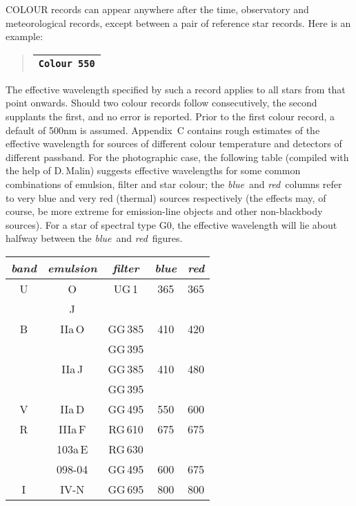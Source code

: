 COLOUR records can appear anywhere after the time,
observatory and meteorological records, except between a
pair of reference star records.  Here is an example:
\begin{quote}
\begin{tabular}{|l|}
\hline
\verb|Colour 550| \\
\hline
\end{tabular}
\end{quote}
The effective
wavelength specified by such a record applies to all
stars from that point onwards.
Should two colour records
follow consecutively, the second supplants the first, and
no error is reported.
Prior to the first colour record,
a default of 500nm is assumed.
Appendix~C contains rough
estimates
of the effective wavelength for sources of different
colour temperature and detectors of different passband.
For the photographic case, the following
table (compiled with the help of D.\,Malin) suggests effective
wavelengths for some common combinations of emulsion, filter and
star colour;  the {\it blue}\, and {\it red}\, columns refer
to very blue and very
red (thermal) sources respectively (the effects may, of
course, be more extreme for emission-line objects and other
non-blackbody sources).  For a star of spectral type G0, the
effective wavelength will lie about halfway between the
{\it blue}\, and {\it red}\, figures.

\begin{center}
\begin{tabular}{|c|c|c||c|c|}
\hline
{\it band} & {\it emulsion} & {\it filter} & {\it blue} & {\it red} \\
\hline \hline
U & O & UG\,1 & 365 & 365 \\
  & J &       &     &     \\
\hline
B & IIa\,O & GG\,385 & 410 & 420 \\
  &        & GG\,395 &     &     \\
\cline{2-5}
  & IIa\,J & GG\,385 & 410 & 480 \\
  &        & GG\,395 &     &     \\
\hline
V & IIa\,D & GG\,495 & 550 & 600 \\
\hline
R & IIIa\,F & RG\,610 & 675 & 675 \\
  & 103a\,E & RG\,630 &     &     \\
\cline{3-5}
  & 098-04 & GG\,495 & 600 & 675 \\
\hline
I & IV-N & GG\,695 & 800 & 800 \\
\hline
\end{tabular}
\end{center}


